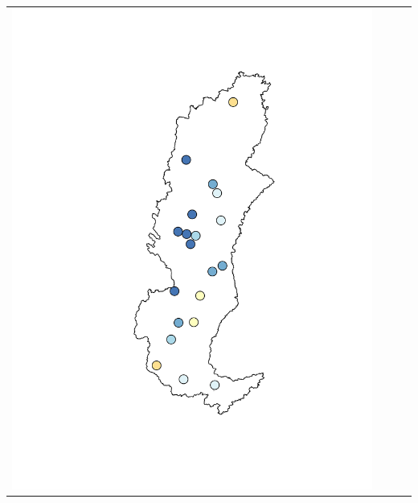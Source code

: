 \begin{landscape}
\begin{tabular}{c c c l}
			\includegraphics[trim= 4cm 2cm 1cm 2cm, clip, scale = 0.35]{./img/pbias_penman} &

\end{tabular}
\end{landscape}
